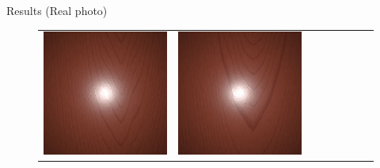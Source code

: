 \documentclass[final]{beamer}
\newlength{\twocolwid}
\newlength{\resultwidth}
\begin{document}
\begin{frame}[t]
\begin{columns}[t]
\begin{column}{\twocolwid}
\begin{block}{Results (Real photo)}
\begin{figure}[t]
\begin{tabular}{ccrclccc}
            		\includegraphics[width=\resultwidth]{images/real/wood/good2.jpg} &
            		\includegraphics[width=\resultwidth]{images/real/wood/good3.jpg} &

\end{tabular}
\end{figure}
\end{block}
\end{column}
\end{columns}
\end{frame}
\end{document}
